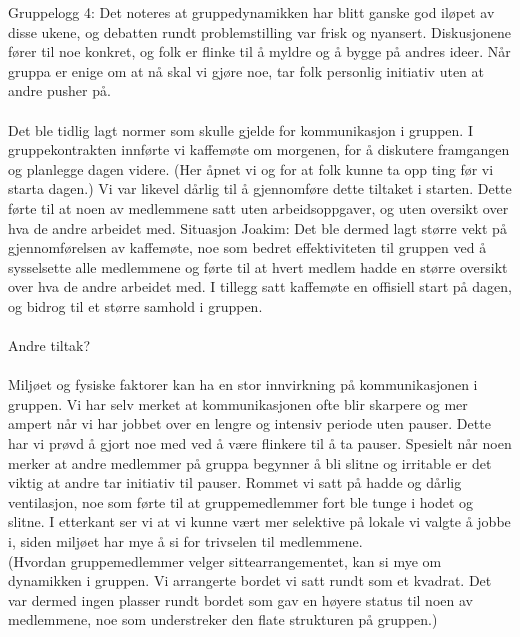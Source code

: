 Gruppelogg 4:
Det noteres at gruppedynamikken har blitt ganske god iløpet av disse ukene, og
debatten rundt problemstilling var frisk og nyansert. Diskusjonene fører til noe
konkret, og folk er flinke til å myldre og å bygge på andres ideer. Når gruppa
er enige om at nå skal vi gjøre noe, tar folk personlig initiativ uten at andre
pusher på.
\\
\\ 
Det ble tidlig lagt normer som skulle gjelde for kommunikasjon i gruppen. I gruppekontrakten innførte vi kaffemøte om morgenen, for å diskutere framgangen og planlegge dagen videre. (Her åpnet vi og for at folk kunne ta opp ting før vi starta dagen.) Vi var likevel dårlig til å gjennomføre dette tiltaket i starten. Dette førte til at noen av medlemmene satt uten arbeidsoppgaver, og uten oversikt over hva de andre arbeidet med. 
Situasjon Joakim:
Det ble dermed lagt større vekt på gjennomførelsen av kaffemøte, noe som bedret effektiviteten til gruppen ved å sysselsette alle medlemmene og førte til at hvert medlem hadde en større oversikt over hva de andre arbeidet med. I tillegg satt kaffemøte en offisiell start på dagen, og bidrog til et større samhold i gruppen. 
\\
\\
Andre tiltak?
\\
\\
Miljøet og fysiske faktorer kan ha en stor innvirkning på kommunikasjonen i gruppen. Vi har selv merket at kommunikasjonen ofte blir skarpere og mer ampert når vi har jobbet over en lengre og intensiv periode uten pauser. Dette har vi prøvd å gjort noe med ved å være flinkere til å ta pauser. Spesielt når noen merker at andre medlemmer på gruppa begynner å bli slitne og irritable er det viktig at andre tar initiativ til pauser. 
Rommet vi satt på hadde og dårlig ventilasjon, noe som førte til at gruppemedlemmer fort ble tunge i hodet og slitne. I etterkant ser vi at vi kunne vært mer selektive på lokale vi valgte å jobbe i, siden miljøet har mye å si for trivselen til medlemmene.
\\
(Hvordan gruppemedlemmer velger sittearrangementet, kan si mye om dynamikken i gruppen. Vi arrangerte bordet vi satt rundt som et kvadrat. Det var dermed ingen plasser rundt bordet som gav en høyere status til noen av medlemmene, noe som understreker den flate strukturen på gruppen.)
\\
\\
